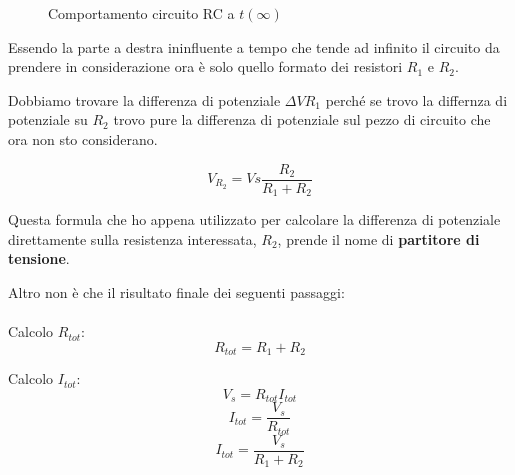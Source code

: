 \begin{figure}[H]
    \centering
    \caption{Comportamento circuito RC a $t(\infty)$}
    \label{fig:circuitoRCtInfinito}
\end{figure}

Essendo la parte a destra ininfluente a tempo che tende ad infinito il circuito da prendere in considerazione ora è solo quello formato dei resistori $R_1$ e $R_2$.

Dobbiamo trovare la differenza di potenziale $\Delta VR_1$ perché se trovo la differnza di potenziale su $R_2$ trovo pure la differenza di potenziale sul pezzo di circuito che ora non sto considerano.

\begin{equation}
    V_{R_2} = Vs \frac{R_2}{R_1 + R_2}
\end{equation}

Questa formula che ho appena utilizzato per calcolare la differenza di potenziale direttamente sulla resistenza interessata, $R_2$, prende il nome di \textbf{partitore di tensione}.

Altro non è che il risultato finale dei seguenti passaggi:

\paragraph{}
Calcolo $R_{tot}: $
\begin{equation*}
    R_{tot} = R_1 + R_2
\end{equation*}

Calcolo $I_{tot}: $
\begin{equation*}
    V_s = R_{tot} I_{tot}
\end{equation*}
\begin{equation*}
      I_{tot} = \frac{V_s}{R_{tot}}
\end{equation*}
\begin{equation*}
      I_{tot} = \frac{V_s}{R_1 + R_2}
\end{equation*}

